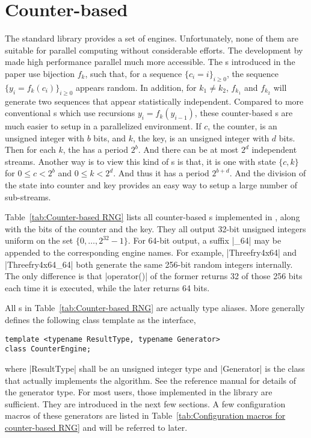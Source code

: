 \section{Counter-based \texorpdfstring{\protect\rng}{RNG}}
\label{sec:Counter-based RNG}

The standard library provides a set of \rng engines. Unfortunately, none of
them are suitable for parallel computing without considerable efforts. The
development by~\cite{Salmon:2011um} made high performance parallel \rng much
more accessible. The \rng{}s introduced in the paper use bijection $f_k$, such
that, for a sequence $\{c_i = i\}_{i\ge0}$, the sequence $\{y_i =
f_k(c_i)\}_{i\ge0}$ appears random. In addition, for $k_1 \ne k_2$, $f_{k_1}$
and $f_{k_2}$ will generate two sequences that appear statistically
independent. Compared to more conventional \rng{}s which use recursions $y_i =
f_k(y_{i - 1})$, these counter-based \rng{}s are much easier to setup in a
parallelized environment. If $c$, the counter, is an unsigned integer with $b$
bits, and $k$, the key, is an unsigned integer with $d$ bits. Then for each
$k$, the \rng has a period $2^b$. And there can be at most $2^d$ independent
streams. Another way is to view this kind of \rng{}s is that, it is one \rng{}
with state $\{c, k\}$ for $0 \le c < 2^b$ and $0 \le k < 2^d$. And thus it has
a period $2^{b + d}$. And the division of the state into counter and key
provides an easy way to setup a large number of sub-streams.

Table~\ref{tab:Counter-based RNG} lists all counter-based \rng{}s implemented
in \mckl, along with the bits of the counter and the key. They all output
32-bit unsigned integers uniform on the set $\{0,\dots,2^{32}-1\}$. For 64-bit
output, a suffix |_64| may be appended to the corresponding \rng engine names.
For example, |Threefry4x64| and |Threefry4x64_64| both generate the same
256-bit random integers internally. The only difference is that |operator()| of
the former returns 32 of those 256 bits each time it is executed, while the
later returns 64 bits.

All \rng{}s in Table~\ref{tab:Counter-based RNG} are actually type aliases.
More generally \mckl defines the following class template as the interface,
\begin{Verbatim}
template <typename ResultType, typename Generator>
class CounterEngine;
\end{Verbatim}
where |ResultType| shall be an unsigned integer type and |Generator| is the
class that actually implements the algorithm. See the reference manual for
details of the generator type. For most users, those implemented in the library
are sufficient. They are introduced in the next few sections. A few
configuration macros of these generators are listed in
Table~\ref{tab:Configuration macros for counter-based RNG} and will be referred
to later.

